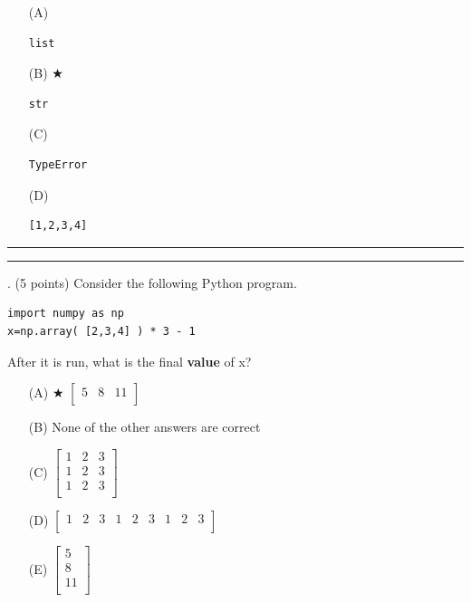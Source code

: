 \documentclass{article}
\begin{document}
\begin{enumerate}
\item[(A)]
\begin{verbatim}list\end{verbatim}

\item[(B)] $\bigstar$ 
\begin{verbatim}str\end{verbatim}

\item[(C)]
\begin{verbatim}TypeError\end{verbatim}

\item[(D)]
\begin{verbatim}[1,2,3,4]\end{verbatim}

\end{enumerate}

\vspace*{2em}
\hrule
\vspace{2em}

\vspace{2em}
\hrule height 2pt


\newpage
{}. (5 points)
Consider the following Python program.
\begin{verbatim}
import numpy as np
x=np.array( [2,3,4] ) * 3 - 1
\end{verbatim}
After it is run, what is the final \textbf{value} of x?


\begin{enumerate}
\item[(A)] $\bigstar$ 
$ \left[ \begin{array}{ccc} 5 & 8 & 11 \\ \end{array} \right] $

\item[(B)]
None of the other answers are correct

\item[(C)]
$ \left[ \begin{array}{ccc} 1 & 2 & 3 \\ 1 & 2 & 3  \\ 1 & 2 & 3  \\ \end{array} \right] $

\item[(D)]
$ \left[ \begin{array}{ccccccccc} 1 & 2 & 3 & 1 & 2 & 3 & 1 & 2 & 3 \\ \end{array} \right] $

\item[(E)]
$ \left[ \begin{array}{c} 5 \\ 8 \\ 11 \\ \end{array} \right] $

\end{enumerate}
\end{document}
